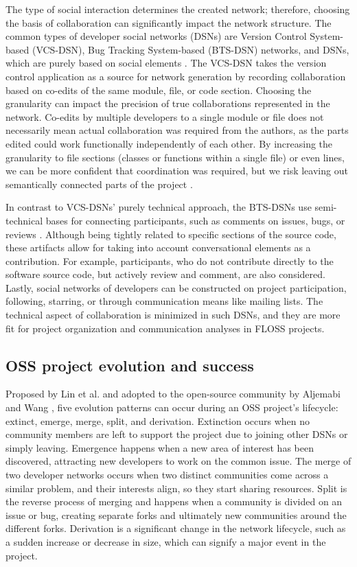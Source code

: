 The type of social interaction determines the created network; therefore, choosing the basis of collaboration can significantly impact the network structure. The common types of developer social networks (DSNs) are Version Control System-based (VCS-DSN), Bug Tracking System-based (BTS-DSN) networks, and DSNs, which are purely based on social elements \cite{aljemabiEmpiricalStudyEvolution2018}. The VCS-DSN takes the version control application as a source for network generation by recording collaboration based on co-edits of the same module, file, or code section. Choosing the granularity can impact the precision of true collaborations represented in the network. Co-edits by multiple developers to a single module or file does not necessarily mean actual collaboration was required from the authors, as the parts edited could work functionally independently of each other. By increasing the granularity to file sections (classes or functions within a single file) or even lines, we can be more confident that coordination was required, but we risk leaving out semantically connected parts of the project \cite{joblinEvolutionaryTrendsDeveloper2017}.

In contrast to VCS-DSNs' purely technical approach, the BTS-DSNs use semi-technical bases for connecting participants, such as comments on issues, bugs, or reviews \cite{elasriPeripheryCoreTemporal2017}. Although being tightly related to specific sections of the source code, these artifacts allow for taking into account conversational elements as a contribution. For example, participants, who do not contribute directly to the software source code, but actively review and comment, are also considered. Lastly, social networks of developers can be constructed on project participation, following, starring, or through communication means like mailing lists. The technical aspect of collaboration is minimized in such DSNs, and they are more fit for project organization and communication analyses in FLOSS projects.

\subsection{OSS project evolution and success}
Proposed by Lin et al. \cite{linBlogCommunityDiscovery2007} and adopted to the open-source community by Aljemabi and Wang \cite{aljemabiEmpiricalStudyEvolution2018}, five evolution patterns can occur during an OSS project's lifecycle: extinct, emerge, merge, split, and derivation. Extinction occurs when no community members are left to support the project due to joining other DSNs or simply leaving. Emergence happens when a new area of interest has been discovered, attracting new developers to work on the common issue. The merge of two developer networks occurs when two distinct communities come across a similar problem, and their interests align, so they start sharing resources. Split is the reverse process of merging and happens when a community is divided on an issue or bug, creating separate forks and ultimately new communities around the different forks. Derivation is a significant change in the network lifecycle, such as a sudden increase or decrease in size, which can signify a major event in the project.

